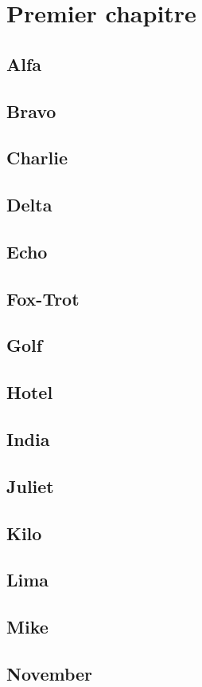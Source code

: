 \documentclass[oneside]{book}
\begin{document}
\dominitoc
\tableofcontents
\chapter{Premier chapitre}
\minitoc
\section{Alfa}
\section{Bravo}
\section{Charlie}
\section{Delta}
\section{Echo}
\section{Fox-Trot}
\section{Golf}
\section{Hotel}
\section{India}
\section{Juliet}
\section{Kilo}
\section{Lima}
\section{Mike}
\section{November}
\end{document}
